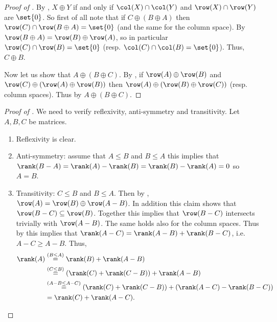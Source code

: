\begin{proof}[Proof of ]
    
    By , \(X \oplus Y\) if and only if \(\col(X) \cap \col(Y)\) and \(\row(X) \cap \row(Y)\) are \(\set{0}\). So first of all note that if \(C \oplus (B \oplus A)\) then \(\row(C) \cap \row(B \oplus A) = \set{0}\) (and the same for the column space). By  \(\row(B \oplus A) = \row(B) \oplus \row(A)\), so in particular \(\row(C) \cap \row(B) = \set{0}\) (resp. \(\col(C) \cap \col(B) = \set{0}\)). Thus, \(C \oplus B\).
    
    Now let us show that \(A \oplus (B \oplus C)\). By , if \(\row(A) \oplus \row(B)\) and \(\row(C) \oplus (\row(A) \oplus \row(B))\) then \(\row(A) \oplus (\row(B) \oplus \row(C))\) (resp. column spaces). Thus by  \(A \oplus (B \oplus C)\).
\end{proof}

\begin{proof}[Proof of ]
We need to verify reflexivity, anti-symmetry and transitivity. Let \(A,B,C\) be matrices.
    \begin{enumerate}
        \item Reflexivity is clear.
        \item Anti-symmetry: assume that \(A \leq B\) and \(B\leq A\) this implies that \(\rank(B-A) = \rank(A)-\rank(B) = \rank(B)-\rank(A)=0\) so \(A=B\).
        \item Transitivity: \(C \leq B\) and \(B \leq A\). Then by , \(\row(A) = \row(B) \oplus \row(A-B)\). In addition this claim shows that \(\row(B-C) \subseteq \row(B)\). Together this implies that \(\row(B-C)\) intersects trivially with \(\row(A-B)\). The same holds also for the column spaces. Thus by  this implies that \(\rank(A-C) = \rank(A-B) + \rank(B-C)\), i.e.\ \(A-C \geq A-B\). Thus,
        \begin{align*}
          \rank(A) &\overset{(B\leq A)}{=} \rank(B) + \rank(A-B)  \\
          &\overset{(C\leq B)}{=} (\rank(C) + \rank(C-B)) + \rank(A-B) \\
          &\overset{(A-B\leq A-C)}{=} (\rank(C) + \rank(C-B)) + (\rank(A-C)-\rank(B-C)) \\
          &= \rank(C) + \rank(A-C).
        \end{align*}
    \end{enumerate}
\end{proof}

